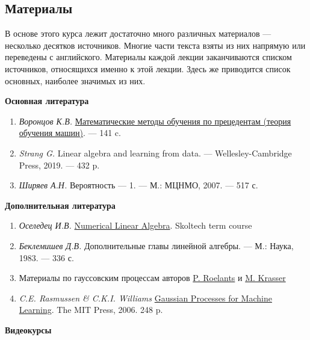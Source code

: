 \documentclass[11pt,a4paper]{article}
\providecommand{\tightlist}{%
      \setlength{\itemsep}{0pt}\setlength{\parskip}{0pt}}
\begin{document}
    \hypertarget{ux43cux430ux442ux435ux440ux438ux430ux43bux44b}{%
\subsection{Материалы}\label{ux43cux430ux442ux435ux440ux438ux430ux43bux44b}}

В основе этого курса лежит достаточно много различных материалов ---
несколько десятков источников. Многие части текста взяты из них напрямую
или переведены с английского. Материалы каждой лекции заканчиваются
списком источников, относящихся именно к этой лекции. Здесь же
приводится список основных, наиболее значимых из них.

\textbf{Основная литература}

\begin{enumerate}
\def\labelenumi{\arabic{enumi}.}
\tightlist
\item
  \emph{Воронцов К.В.}
  \href{http://www.machinelearning.ru/wiki/images/6/6d/Voron-ML-1.pdf}{Математические
  методы обучения по прецедентам (теория обучения машин)}. --- 141 c.
\item
  \emph{Strang G.} Linear algebra and learning from data. ---
  Wellesley-Cambridge Press, 2019. --- 432 p.
\item
  \emph{Ширяев А.Н.} Вероятность --- 1. --- М.: МЦНМО, 2007. --- 517 с.
\end{enumerate}

\textbf{Дополнительная литература}

\begin{enumerate}
\def\labelenumi{\arabic{enumi}.}
\tightlist
\item
  \emph{Оселедец И.В.}
  \href{https://nla.skoltech.ru/index.html}{Numerical Linear Algebra}.
  Skoltech term course
\item
  \emph{Беклемишев Д.В.} Дополнительные главы линейной алгебры. --- М.:
  Наука, 1983. --- 336 с.
\item
  Материалы по гауссовским процессам авторов
  \href{https://peterroelants.github.io/}{P. Roelants} и
  \href{http://krasserm.github.io/}{M. Krasser}
\item
  \emph{C.E. Rasmussen \& C.K.I. Williams}
  \href{http://www.gaussianprocess.org/gpml/}{Gaussian Processes for
  Machine Learning}. The MIT Press, 2006. 248 p.
\end{enumerate}

\textbf{Видеокурсы}
\end{document}

